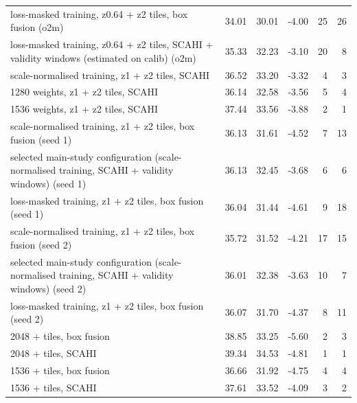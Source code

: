 \begin{tabular}{lrrrrr}
loss-masked training, z0.64 + z2 tiles, box fusion (o2m) & 34.01 & 30.01 & -4.00 & 25 & 26 \\
loss-masked training, z0.64 + z2 tiles, SCAHI + validity windows (estimated on calib) (o2m) & 35.33 & 32.23 & -3.10 & 20 & 8 \\
scale-normalised training, z1 + z2 tiles, SCAHI & 36.52 & 33.20 & -3.32 & 4 & 3 \\
1280 weights, z1 + z2 tiles, SCAHI & 36.14 & 32.58 & -3.56 & 5 & 4 \\
1536 weights, z1 + z2 tiles, SCAHI & 37.44 & 33.56 & -3.88 & 2 & 1 \\
scale-normalised training, z1 + z2 tiles, box fusion (seed 1) & 36.13 & 31.61 & -4.52 & 7 & 13 \\
selected main-study configuration (scale-normalised training, SCAHI + validity windows) (seed 1) & 36.13 & 32.45 & -3.68 & 6 & 6 \\
loss-masked training, z1 + z2 tiles, box fusion (seed 1) & 36.04 & 31.44 & -4.61 & 9 & 18 \\
scale-normalised training, z1 + z2 tiles, box fusion (seed 2) & 35.72 & 31.52 & -4.21 & 17 & 15 \\
selected main-study configuration (scale-normalised training, SCAHI + validity windows) (seed 2) & 36.01 & 32.38 & -3.63 & 10 & 7 \\
loss-masked training, z1 + z2 tiles, box fusion (seed 2) & 36.07 & 31.70 & -4.37 & 8 & 11 \\
\midrule
2048 + tiles, box fusion & 38.85 & 33.25 & -5.60 & 2 & 3 \\
2048 + tiles, SCAHI & 39.34 & 34.53 & -4.81 & 1 & 1 \\
1536 + tiles, box fusion & 36.66 & 31.92 & -4.75 & 4 & 4 \\
1536 + tiles, SCAHI & 37.61 & 33.52 & -4.09 & 3 & 2 \\
\bottomrule
\end{tabular}
